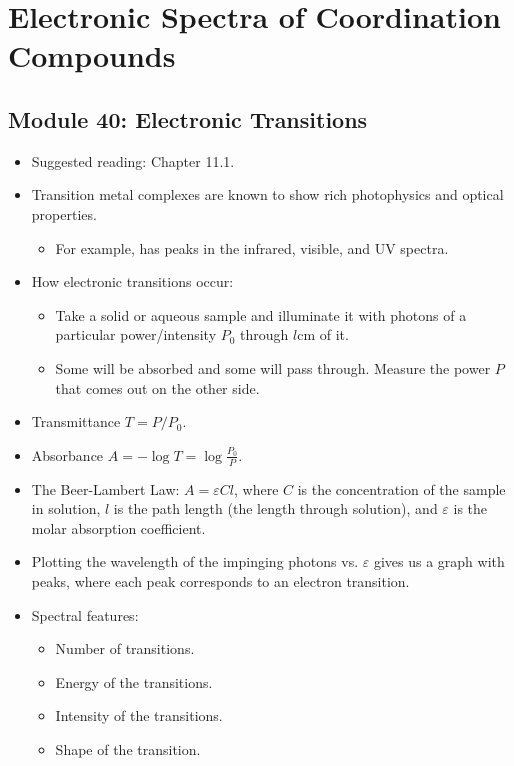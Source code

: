 \documentclass[../notes.tex]{subfiles}
\begin{document}
\chapter{Electronic Spectra of Coordination Compounds}
\section{Module 40: Electronic Transitions}
\begin{itemize}
    \item {}Suggested reading: Chapter 11.1.
    \item Transition metal complexes are known to show rich photophysics and optical properties.
    \begin{itemize}
        \item For example,  has peaks in the infrared, visible, and UV spectra.
    \end{itemize}
    \item How electronic transitions occur:
    \begin{itemize}
        \item Take a solid or aqueous sample and illuminate it with photons of a particular power/intensity $P_0$ through $l\si{\centi\meter}$ of it.
        \item Some will be absorbed and some will pass through. Measure the power $P$ that comes out on the other side.
    \end{itemize}
    \item Transmittance $T=P/P_0$.
    \item Absorbance $A=-\log T=\log\frac{P_0}{P}$.
    \item The Beer-Lambert Law: $A=\varepsilon Cl$, where $C$ is the concentration of the sample in solution, $l$ is the path length (the length through solution), and $\varepsilon$ is the molar absorption coefficient.
    \item Plotting the wavelength of the impinging photons vs. $\varepsilon$ gives us a graph with peaks, where each peak corresponds to an electron transition.
    \item Spectral features:
    \begin{itemize}
        \item Number of transitions.
        \item Energy of the transitions.
        \item Intensity of the transitions.
        \item Shape of the transition.
    \end{itemize}

\end{itemize}
\end{document}
